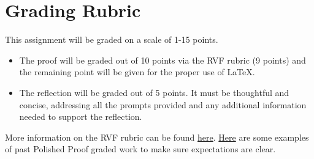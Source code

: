 \documentclass{article}
\theoremstyle{definition}
\begin{document}
\section*{Grading Rubric}
    This assignment will be graded on a scale of 1-15 points.
    \begin{itemize}
    \item The proof will be graded out of 10 points via the RVF rubric (9 points) and the remaining point will be given for the proper use of \LaTeX.
    \item The reflection will be graded out of 5 points. It must be thoughtful and concise, addressing all the prompts provided and any additional information needed to support the reflection.
    \end{itemize}
     
    More information on the RVF rubric can be found 
    \href{https://drive.google.com/file/d/1P0OBjw-GkX64uCpYcqYmXARapf9MwaiI/view?usp=sharing}{here}. 
    \href{https://drive.google.com/file/d/1KAFQ7GBFpfUkyTBRZ30h5o6nXWwYDSML/view?usp=sharing}{Here} 
    are some examples of past Polished Proof graded work to make sure expectations are clear. 
	
\end{document}
